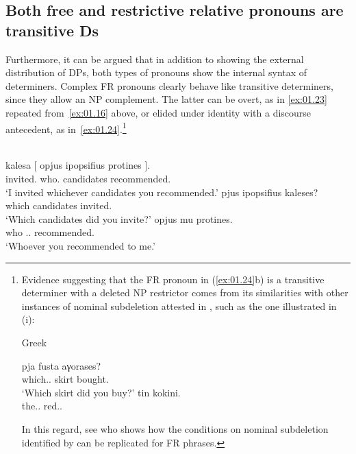 \documentclass[output=paper]{langsci/langscibook}
\begin{document}
\subsection{Both free and restrictive relative pronouns are transitive Ds}\label{sub:01.4.2}

Furthermore, it can be argued that in addition to showing the external
distribution of DPs, both types of pronouns show the internal syntax of
determiners. Complex \gls{FR} pronouns clearly behave like transitive
determiners, since they allow an NP complement. The latter can be overt, as in
\eqref{ex:01.23} repeated from~\eqref{ex:01.16} above, or elided under
identity with a discourse antecedent, as
in~\eqref{ex:01.24}.\footnote{Evidence suggesting that the \gls{FR} pronoun
    in (\ref{ex:01.24}b) is a transitive determiner with a deleted NP
    restrictor comes from its similarities with other instances of nominal
    subdeletion attested in , such as the one illustrated in (i):

\begin{exe}
     Greek
    \begin{xlist}
        \ex
		\gll pja fusta aγorases?\\
			which.\glossF.\Sg{} skirt bought.\Ssg{}\\
		\glt \enquote*{Which skirt did you buy?}
        \ex
		\gll tin kokini.\\
			the.\glossF.\Sg{} red.\glossF.\Sg{}\\
    \end{xlist}
\end{exe}

In this regard, see \citet{Daskalaki2009} who shows how the conditions on
nominal subdeletion identified by  \textcite{GiaSta1999} can be
replicated for \gls{FR} phrases.}

\ea {}\label{ex:01.23}\\
	\gll kalesa [ opjus ipopsifius protines ].\\
    invited.\Fsg{} {} who.\Acc{} candidates recommended.\Ssg{} {}\\
	\glt \enquote*{I invited whichever candidates you recommended.}
\ex {}\label{ex:01.24}
	\ea
		\gll pjus ipopsifius kaleses?\\
			which candidates invited.\Ssg{}\\
		\glt \enquote*{Which candidates did you invite?}
	\ex
		\gll opjus mu protines.\\
			who \Cl.\Fsg.\Gen{} recommended.\Ssg{}\\
		\glt \enquote*{Whoever you recommended to me.}
	\z
\z
\end{document}
